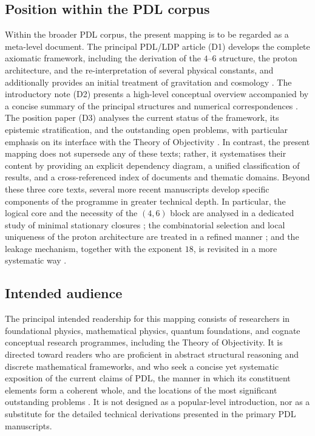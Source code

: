 \documentclass{article}
\begin{document}
\subsection{Position within the PDL corpus}
\label{subsec:position_corpus}

Within the broader PDL corpus, the present mapping is to be regarded as a meta-level document. The principal PDL/LDP article (D1) develops the complete axiomatic framework, including the derivation of the $4$–$6$ structure, the proton architecture, and the re-interpretation of several physical constants, and additionally provides an initial treatment of gravitation and cosmology \cite{PDL_Main_2026}. The introductory note (D2) presents a high-level conceptual overview accompanied by a concise summary of the principal structures and numerical correspondences \cite{PDL_intro}. The position paper (D3) analyses the current status of the framework, its epistemic stratification, and the outstanding open problems, with particular emphasis on its interface with the Theory of Objectivity \cite{PDL_position}. In contrast, the present mapping does not supersede any of these texts; rather, it systematises their content by providing an explicit dependency diagram, a unified classification of results, and a cross-referenced index of documents and thematic domains. 
Beyond these three core texts, several more recent manuscripts develop specific components of the programme in greater technical depth. In particular, the logical core and the necessity of the $(4,6)$ block are analysed in a dedicated study of minimal stationary closures \cite{Minimal_Stationary_Closures_2026}; the combinatorial selection and local uniqueness of the proton architecture are treated in a refined manner \cite{Proton_Local_Uniqueness_2026,Combinatorial_Proton_v2_2026}; and the leakage mechanism, together with the exponent $18$, is revisited in a more systematic way \cite{Coherence_Leakage_18_2026,Exponent_18_PDL_2026}.

\subsection{Intended audience}
\label{subsec:intended_audience}

The principal intended readership for this mapping consists of researchers in foundational physics, mathematical physics, quantum foundations, and cognate conceptual research programmes, including the Theory of Objectivity. It is directed toward readers who are proficient in abstract structural reasoning and discrete mathematical frameworks, and who seek a concise yet systematic exposition of the current claims of PDL, the manner in which its constituent elements form a coherent whole, and the locations of the most significant outstanding problems \cite{PDL_intro,PDL_TO_dialogue,PDL_position}. It is not designed as a popular-level introduction, nor as a substitute for the detailed technical derivations presented in the primary PDL manuscripts.
\end{document}
